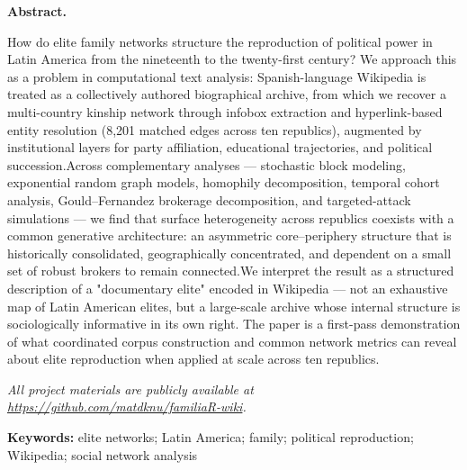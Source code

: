 \begin{minipage}[t]{0.92\textwidth}
\setlength{\parskip}{0.32em}
\noindent\textbf{Abstract.}\quad\small

How do elite family networks structure the reproduction of political power in Latin America from the nineteenth to the twenty-first century? We approach this as a problem in computational text analysis: Spanish-language Wikipedia is treated as a collectively authored biographical archive, from which we recover a multi-country kinship network through infobox extraction and hyperlink-based entity resolution (8,201 matched edges across ten republics), augmented by institutional layers for party affiliation, educational trajectories, and political succession.Across complementary analyses — stochastic block modeling, exponential random graph models, homophily decomposition, temporal cohort analysis, Gould–Fernandez brokerage decomposition, and targeted-attack simulations — we find that surface heterogeneity across republics coexists with a common generative architecture: an asymmetric core–periphery structure that is historically consolidated, geographically concentrated, and dependent on a small set of robust brokers to remain connected.We interpret the result as a structured description of a "documentary elite" encoded in Wikipedia — not an exhaustive map of Latin American elites, but a large-scale archive whose internal structure is sociologically informative in its own right. The paper is a first-pass demonstration of what coordinated corpus construction and common network metrics can reveal about elite reproduction when applied at scale across ten republics.

\vspace{0.55em}
\noindent\small\textit{All project materials are publicly available at \url{https://github.com/matdknu/familiaR-wiki}.}

\vspace{0.75em}
\noindent\textbf{Keywords:}\quad
elite networks; Latin America; family; political reproduction; Wikipedia; social network analysis
\end{minipage}
\par\endgroup
